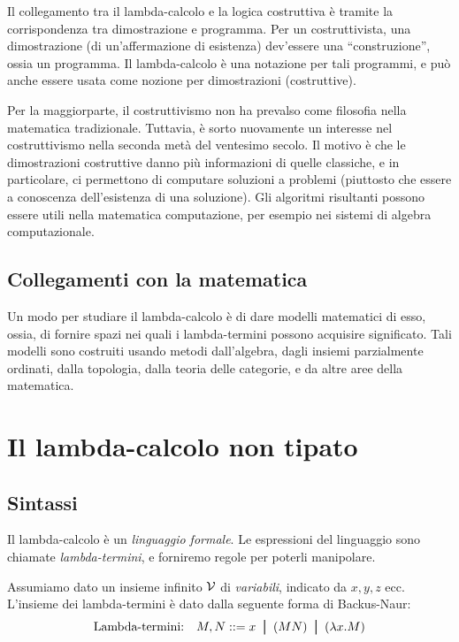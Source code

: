 \documentclass{article}
\begin{document}
Il collegamento tra il lambda-calcolo e la logica costruttiva \`e tramite 
la corrispondenza tra dimostrazione e programma. Per un costruttivista, 
una dimostrazione (di un'affermazione di esistenza) dev'essere una 
``construzione'', ossia un programma.
Il lambda-calcolo \`e una notazione per tali programmi, e pu\`o anche
essere usata come nozione per dimostrazioni (costruttive).

Per la maggiorparte, il costruttivismo non ha prevalso come filosofia
nella matematica tradizionale. Tuttavia, \`e sorto nuovamente un interesse
nel costruttivismo nella seconda met\`a del ventesimo secolo. Il motivo \`e
che le dimostrazioni costruttive danno pi\`u informazioni di quelle classiche,
e in particolare, ci permettono di computare soluzioni a problemi (piuttosto
che essere a conoscenza dell'esistenza di una soluzione). Gli algoritmi
risultanti possono essere utili nella matematica computazione, per esempio
nei sistemi di algebra computazionale.

\subsection{Collegamenti con la matematica}

Un modo per studiare il lambda-calcolo \`e di dare modelli matematici di
esso, ossia, di fornire spazi nei quali i lambda-termini possono acquisire
significato. Tali modelli sono costruiti usando metodi dall'algebra,
dagli insiemi parzialmente ordinati, dalla topologia, dalla teoria delle 
categorie, e da altre aree della matematica.

\section{Il lambda-calcolo non tipato}

\subsection{Sintassi}

Il lambda-calcolo \`e un {\em linguaggio formale}. Le espressioni del 
linguaggio sono chiamate {\em lambda-termini}, e forniremo regole per
poterli manipolare.

\begin{definition}
  Assumiamo dato un insieme infinito ${\cal V}$ di {\em variabili},
  indicato da $x,y,z$ ecc. L'insieme dei lambda-termini \`e dato dalla
  seguente forma di Backus-Naur:
  \[  \mbox{Lambda-termini:}\ssep M,N \bnf x \bor (MN) \bor (\lam x.M)
  \]
\end{definition}
\end{document}
